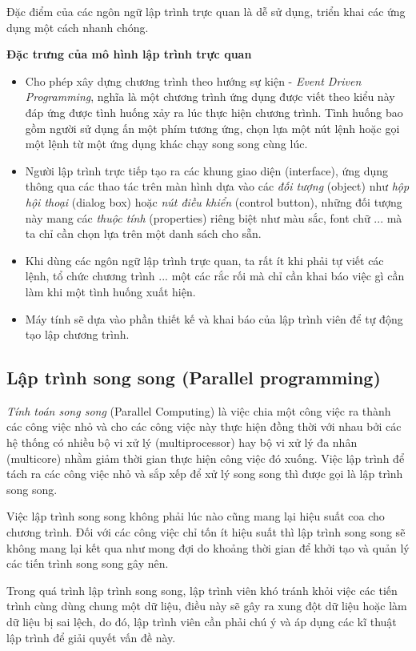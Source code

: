 \documentclass[10pt, a4paper]{article}
\begin{document}
Đặc điểm của các ngôn ngữ lập trình trực quan là dễ sử dụng, triển khai các ứng dụng một cách nhanh chóng.

\textbf{Đặc trưng của mô hình lập trình trực quan}
\begin{itemize}
\item Cho phép xây dựng chương trình theo hướng sự kiện - \emph{Event Driven Programming}, nghĩa là một chương trình ứng dụng được viết theo kiểu này đáp ứng được tình huống xảy ra lúc thực hiện chương trình. Tình huống bao gồm người sử dụng ấn một phím tương ứng, chọn lựa một nút lệnh hoặc gọi một lệnh từ một ứng dụng khác chạy song song cùng lúc.
\item Người lập trình trực tiếp tạo ra các khung giao diện (interface), ứng dụng thông qua các thao tác trên màn hình dựa vào các \emph{đối tượng} (object) như \emph{hộp hội thoại} (dialog box) hoặc \emph{nút điều khiển} (control button), những đối tượng này mang các \emph{thuộc tính} (properties) riêng biệt như màu sắc, font chữ ... mà ta chỉ cần chọn lựa trên một danh sách cho sẵn.
\item Khi dùng các ngôn ngữ lập trình trực quan, ta rất ít khi phải tự viết các lệnh, tổ chức chương trình ... một các rắc rối mà chỉ cần khai báo việc gì cần làm khi một tình huống xuất hiện.
\item Máy tính sẽ dựa vào phần thiết kế và khai báo của lập trình viên để tự động tạo lập chương trình.
\end{itemize}

\subsection{Lập trình song song (Parallel programming)}

\emph{Tính toán song song} (Parallel Computing) là việc chia một công việc ra thành các công việc nhỏ và cho các công việc này thực hiện đồng thời với nhau bởi các hệ thống có nhiều bộ vi xử lý (multiprocessor) hay bộ vi xử lý đa nhân (multicore) nhằm giảm thời gian thực hiện công việc đó xuống. Việc lập trình để tách ra các công việc nhỏ và sắp xếp để xử lý song song thì được gọi là lập trình song song.

Việc lập trình song song không phải lúc nào cũng mang lại hiệu suất coa cho chương trình. Đối với các công việc chỉ tốn ít hiệu suất thì lập trình song song sẽ không mang lại kết qua như mong đợi do khoảng thời gian để khởi tạo và quản lý các tiến trình song song gây nên.

Trong quá trình lập trình song song, lập trình viên khó tránh khỏi việc các tiến trình cùng dùng chung một dữ liệu, điều này sẽ gây ra xung đột dữ liệu hoặc làm dữ liệu bị sai lệch, do đó, lập trình viên cần phải chú ý và áp dụng các kĩ thuật lập trình để giải quyết vấn đề này.
\end{document}
